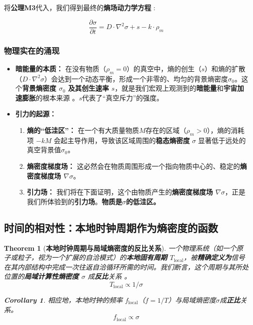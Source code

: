\documentclass[11pt, a4paper]{article}
\newtheorem{theorem}{Theorem}[section]
\newtheorem{corollary}{Corollary}[section]
\begin{document}
将\textbf{公理M3}代入，我们得到最终的\textbf{熵场动力学方程} \cite{Newton1687}:

\[
\frac{\partial\sigma}{\partial t} = D \cdot \nabla^2\sigma + s - k \cdot \rho_m
\]

\subsubsection{物理实在的涌现}

\begin{itemize}
    \item \textbf{暗能量的本质：} 在没有物质（$\rho_m = 0$）的真空中，熵的创生（$s$）和熵的扩散（$D \cdot \nabla^2\sigma$）会达到一个动态平衡，形成一个非零的、均匀的背景熵密度$\sigma_0$。这个\textbf{背景熵密度 $\sigma_0$ 及其创生速率 $s$}，就是我们宏观上观测到的\textbf{暗能量}和\textbf{宇宙加速膨胀}的根本来源 \cite{Planck2020}。$s$代表了“真空斥力”的强度。

    \item \textbf{引力的起源：}
    \begin{enumerate}
        \item \textbf{熵的“低洼区”：} 在一个有大质量物质$M$存在的区域（$\rho_m > 0$），熵的消耗项 $-kM$ 会起主导作用，导致该区域周围的\textbf{稳态熵密度} $\sigma$ 显著低于远处的真空背景值$\sigma_0$。
        \item \textbf{熵密度梯度场：} 这必然会在物质周围形成一个指向物质中心的、稳定的\textbf{熵密度梯度场 $\nabla\sigma$}。
        \item \textbf{引力场：} 我们将在下面证明，这个由物质产生的\textbf{熵密度梯度场 $\nabla\sigma$}，正是我们所体验到的\textbf{引力场}。\textbf{物质是$\sigma$的低洼区。}
    \end{enumerate}
\end{itemize}

\subsection{时间的相对性：本地时钟周期作为熵密度的函数}

\begin{theorem}[\textbf{本地时钟周期与局域熵密度的反比关系}]
一个物理系统（如一个原子或粒子，视为一个扩展的自洽模式）的\textbf{本地固有周期 $T_{\text{local}}$}，被\textbf{精确定义为}信号在其内部结构中完成一次往返自洽循环所需的时间。我们断言，这个周期与其所处位置的\textbf{局域计算性熵密度 $\sigma$} 成\textbf{反比}关系 \cite{Einstein1905}。
\[
T_{\text{local}} \propto 1/\sigma
\]
\begin{corollary}
相应地，本地时钟的频率 $f_{\text{local}}$（$f=1/T$）与局域熵密度$\sigma$成\textbf{正比}关系。
\[
f_{\text{local}} \propto \sigma
\]
\end{corollary}
\end{theorem}
\end{document}
